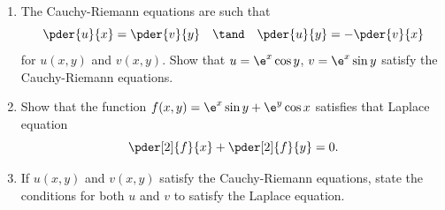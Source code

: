 \begin{problem}
    \begin{enumerate}
        \item The Cauchy-Riemann equations are such that \[\pder{u}{x} = \pder{v}{y} \quad \tand \quad \pder{u}{y} = -\pder{v}{x}\] for $u(x, y)$ and $v(x, y)$. Show that $u = \e^x \cos y$, $v = \e^x \sin y$ satisfy the Cauchy-Riemann equations.
        \item Show that the function $f(x, y) = \e^x \sin y + \e^y \cos x$ satisfies that Laplace equation \[\pder[2]{f}{x} + \pder[2]{f}{y} = 0.\]
        \item If $u(x, y)$ and $v(x, y)$ satisfy the Cauchy-Riemann equations, state the conditions for both $u$ and $v$ to satisfy the Laplace equation.
    \end{enumerate}
\end{problem}
